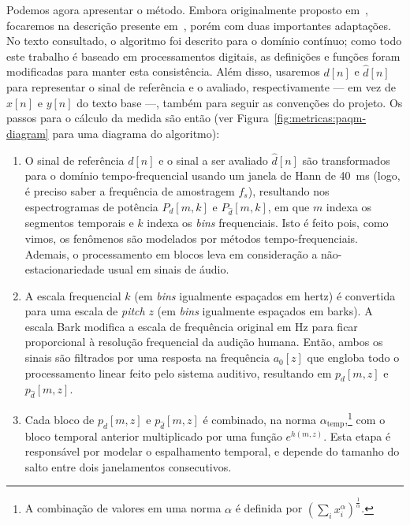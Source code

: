 Podemos agora apresentar o método. Embora originalmente proposto
em~\cite{beerends-1992}, focaremos na descrição presente em~\cite{beerends-2002}, porém
com duas importantes adaptações. No texto consultado, o algoritmo foi descrito para o
domínio contínuo; como todo este trabalho é baseado em processamentos digitais, as
definições e funções foram modificadas para manter esta consistência. Além disso,
usaremos $d[n]$ e $\hat{d}[n]$ para representar o sinal de referência e o avaliado,
respectivamente --- em vez de $x[n]$ e $y[n]$ do texto base ---, também para seguir as
convenções do projeto. Os passos para o cálculo da medida são então (ver
Figura~\ref{fig:metricas:paqm-diagram} para uma diagrama do algoritmo):
\begin{enumerate}
	\item O sinal de referência $d[n]$ e o sinal a ser avaliado $\hat{d}[n]$ são transformados
	      para o domínio tempo-frequencial usando um janela de Hann de 40~ms (logo, é preciso
	      saber a frequência de amostragem $f_s$), resultando nos espectrogramas de potência $P_d[m, k]$ e
	      $P_{\hat{d}}[m, k]$, em que $m$ indexa os segmentos temporais e $k$ indexa os
	      \textit{bins} frequenciais. Isto é feito pois, como vimos, os fenômenos são modelados
	      por métodos tempo-frequenciais. Ademais, o processamento em blocos leva em consideração
	      a não-estacionariedade usual em sinais de áudio.

	\item A escala frequencial $k$ (em \textit{bins} igualmente espaçados em hertz) é convertida
	      para uma escala de \textit{pitch} $z$ (em \textit{bins} igualmente espaçados em barks).
	      A escala Bark modifica a escala de frequência original em Hz para ficar proporcional à
	      resolução frequencial da audição humana. Então, ambos os sinais são filtrados por uma
	      resposta na frequência $a_0[z]$ que engloba todo o processamento linear feito pelo
	      sistema auditivo, resultando em $p_d[m, z]$ e $p_{\hat{d}}[m, z]$.

	\item Cada bloco de $p_d[m, z]$ e $p_{\hat{d}}[m, z]$ é combinado, na norma
	      $\alpha_{\text{temp}}$,\footnote{A combinação de valores em uma norma $\alpha$ é
		      definida por $(\sum_i x_i^\alpha)^{\frac{1}{\alpha}}$.} com o bloco temporal anterior
	      multiplicado por uma função $e^{h(m, z)}$. Esta etapa é responsável por modelar o
	      espalhamento temporal, e depende do tamanho do salto entre dois janelamentos
	      consecutivos.


\end{enumerate}
